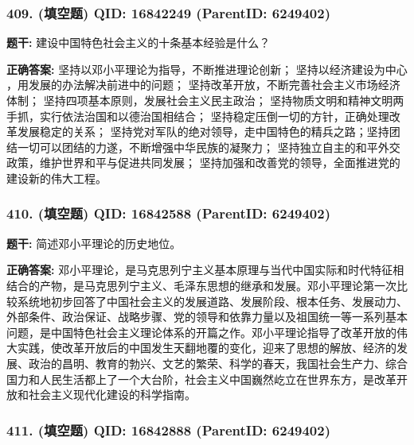 \documentclass[12pt,UTF8]{ctexart}
\begin{document}
\vspace{0.3em}\hrulefill\vspace{0.7em}

\subsubsection*{409. (填空题) \small QID: 16842249 (ParentID: 6249402)}

\textbf{题干:}
建设中国特色社会主义的十条基本经验是什么？



\textbf{正确答案:}
坚持以邓小平理论为指导，不断推进理论创新；
坚持以经济建设为中心 ，用发展的办法解决前进中的问题；
坚持改革开放，不断完善社会主义市场经济体制；
坚持四项基本原则，发展社会主义民主政治；
坚持物质文明和精神文明两手抓，实行依法治国和以德治国相结合；
坚持稳定压倒一切的方针，正确处理改革发展稳定的关系；
坚持党对军队的绝对领导，走中国特色的精兵之路；坚持团结一切可以团结的力遂，不断增强中华民族的凝聚力；
坚持独立自主的和平外交政策，维护世界和平与促进共同发展；
坚持加强和改善党的领导，全面推进党的建设新的伟大工程。

\vspace{0.3em}\hrulefill\vspace{0.7em}

\subsubsection*{410. (填空题) \small QID: 16842588 (ParentID: 6249402)}

\textbf{题干:}
简述邓小平理论的历史地位。



\textbf{正确答案:}
邓小平理论，是马克思列宁主义基本原理与当代中国实际和时代特征相结合的产物，是马克思列宁主义、毛泽东思想的继承和发展。邓小平理论第一次比较系统地初步回答了中国社会主义的发展道路、发展阶段、根本任务、发展动力、外部条件、政治保证、战略步骤、党的领导和依靠力量以及祖国统一等一系列基本问题，是中国特色社会主义理论体系的开篇之作。邓小平理论指导了改革开放的伟大实践，使改革开放后的中国发生天翻地覆的变化，迎来了思想的解放、经济的发展、政治的昌明、教育的勃兴、文艺的繁荣、科学的春天，我国社会生产力、综合国力和人民生活都上了一个大台阶，社会主义中国巍然屹立在世界东方，是改革开放和社会主义现代化建设的科学指南。

\vspace{0.3em}\hrulefill\vspace{0.7em}

\subsubsection*{411. (填空题) \small QID: 16842888 (ParentID: 6249402)}
\end{document}
